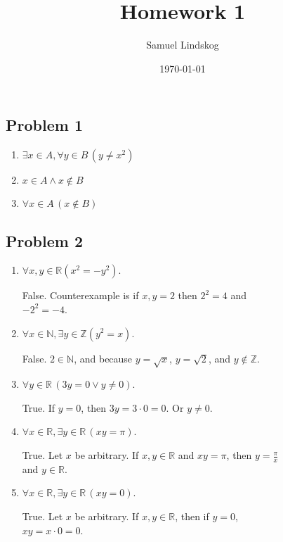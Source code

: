 \documentclass{article}
\title{Homework 1}
\author{Samuel Lindskog}
\date\today
\begin{document}
\maketitle %

\subsection*{Problem 1}
\begin{enumerate}[label=(\alph*)]
	\item \(\exists x\in A,\forall y\in B\,(y\neq x^2)\)
	\item \(x\in A\wedge x\notin B\)
	\item \(\forall x\in A\,(x\notin B)\)
\end{enumerate}

\subsection*{Problem 2}
\begin{enumerate}[label=(\alph*)]
	\item \(\forall x,y\in\mathbb{R}(x^2=-y^2)\).
		\begin{IEEEproof}
			False. Counterexample is if \(x,y=2\) then \(2^2=4\) and \\\(-2^2=-4\).
		\end{IEEEproof}
	\item \(\forall x\in\mathbb{N},\exists y\in\mathbb{Z}(y^2=x)\).
		\begin{IEEEproof}
			False. \(2\in\mathbb{N}\), and because \(y=\sqrt{x}\), \(y=\sqrt{2}\), and \(y\notin\mathbb{Z}\).
		\end{IEEEproof}
	\item \(\forall y\in\mathbb{R}\,(3y=0\vee y\neq 0)\).
		\begin{IEEEproof}
			True. If \(y=0\), then \(3y=3\cdot 0=0\). Or \(y\neq 0\).
		\end{IEEEproof}
	\item \(\forall x\in\mathbb{R},\exists y\in\mathbb{R}\,(xy=\pi)\).
		\begin{IEEEproof}
			True. Let \(x\) be arbitrary. If \(x,y\in\mathbb{R}\) and \(xy=\pi\), then \(y=\frac{\pi}{x}\) \\and \(y\in\mathbb{R}\).
		\end{IEEEproof}
	\item \(\forall x\in\mathbb{R}, \exists y\in\mathbb{R}\,(xy=0)\).
		\begin{IEEEproof}
			True. Let \(x\) be arbitrary. If \(x,y\in\mathbb{R}\), then if \(y=0\),\\\(xy=x\cdot 0=0\).
		\end{IEEEproof}
\end{enumerate}
\end{document}
